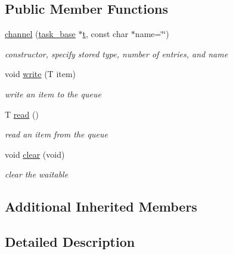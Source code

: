 \subsection*{Public Member Functions}
\begin{DoxyCompactItemize}
\item 
\hyperlink{classrtos_1_1channel_a87ceb9b710e5f20399ff35be85b21bd4}{channel} (\hyperlink{classrtos_1_1task__base}{task\+\_\+base} $\ast$\hyperlink{classrtos_1_1event_aa83745aabc941145f00386fd63f6b557}{t}, const char $\ast$name=\char`\"{}\char`\"{})
\begin{DoxyCompactList}\small\item\em constructor, specify stored type, number of entries, and name \end{DoxyCompactList}\item 
void \hyperlink{classrtos_1_1channel_ad188535be39b5884f69e3eb8edf070d4}{write} (T item)\hypertarget{classrtos_1_1channel_ad188535be39b5884f69e3eb8edf070d4}{}\label{classrtos_1_1channel_ad188535be39b5884f69e3eb8edf070d4}

\begin{DoxyCompactList}\small\item\em write an item to the queue \end{DoxyCompactList}\item 
T \hyperlink{classrtos_1_1channel_ad19a4d179e9274aab49b52200e1808ab}{read} ()\hypertarget{classrtos_1_1channel_ad19a4d179e9274aab49b52200e1808ab}{}\label{classrtos_1_1channel_ad19a4d179e9274aab49b52200e1808ab}

\begin{DoxyCompactList}\small\item\em read an item from the queue \end{DoxyCompactList}\item 
void \hyperlink{classrtos_1_1channel_a0a86102d13f98ef7258a3fadbc881abd}{clear} (void)
\begin{DoxyCompactList}\small\item\em clear the waitable \end{DoxyCompactList}\end{DoxyCompactItemize}
\subsection*{Additional Inherited Members}


\subsection{Detailed Description}

